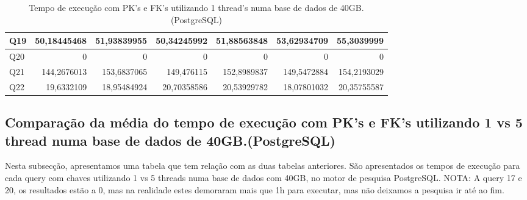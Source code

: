 \documentclass{article}
\begin{document}
\begin{table}[H]
{\begin{tabular}{|l|r|r|r|r|r|r|}
Q19&	50,18445468&	51,93839955	&50,34245992&	51,88563848	&53,62934709&	55,3039999\\ \hline
Q20&	0&	0	&0&	0	&0	&0\\ \hline
Q21&	144,2676013&	153,6837065&	149,476115	&152,8989837	&149,5472884&	154,2193029\\ \hline
Q22&	19,6332109&	18,95484924	&20,70358586	&20,53929782	&18,07801032&	20,35755587\\ \hline
    \end{tabular}}
    \caption{Tempo de execução com PK's e FK's utilizando 1 thread's numa base de dados de 40GB.(PostgreSQL)}
    \label{tab:BC_Table6}
  \end{table}

\clearpage
  \subsection{Comparação da média do tempo de execução com PK's e FK's utilizando 1 vs 5 thread numa base de dados de 40GB.(PostgreSQL)}
\texttt{}\par Nesta subsecção, apresentamos uma tabela que tem relação com as duas tabelas anteriores. São apresentados os tempos de execução para cada query com chaves utilizando 1 vs 5 threads numa base de dados com 40GB, no motor de pesquisa PostgreSQL.
NOTA: A query 17 e 20, os resultados estão a 0, mas na realidade estes demoraram mais que 1h para executar, mas não deixamos a pesquisa ir até ao fim.
\end{document}
